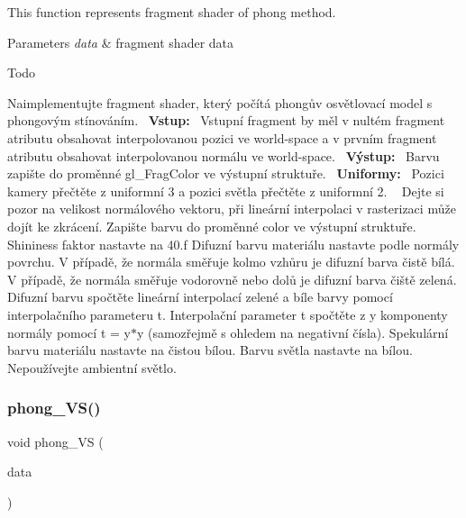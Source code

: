 This function represents fragment shader of phong method. 


\begin{DoxyParams}{Parameters}
{\em data} & fragment shader data \\
\hline
\end{DoxyParams}
\begin{DoxyRefDesc}{Todo}
\item[\hyperlink{todo__todo000003}{Todo}]Naimplementujte fragment shader, který počítá phongův osvětlovací model s phongovým stínováním.~\newline
 {\bfseries Vstup\+:}~\newline
 Vstupní fragment by měl v nultém fragment atributu obsahovat interpolovanou pozici ve world-\/space a v prvním fragment atributu obsahovat interpolovanou normálu ve world-\/space.~\newline
 {\bfseries Výstup\+:}~\newline
 Barvu zapište do proměnné gl\+\_\+\+Frag\+Color ve výstupní struktuře.~\newline
 {\bfseries Uniformy\+:}~\newline
 Pozici kamery přečtěte z uniformní 3 a pozici světla přečtěte z uniformní 2. ~\newline
 Dejte si pozor na velikost normálového vektoru, při lineární interpolaci v rasterizaci může dojít ke zkrácení. Zapište barvu do proměnné color ve výstupní struktuře. Shininess faktor nastavte na 40.\+f Difuzní barvu materiálu nastavte podle normály povrchu. V případě, že normála směřuje kolmo vzhůru je difuzní barva čistě bílá. V případě, že normála směřuje vodorovně nebo dolů je difuzní barva čiště zelená. Difuzní barvu spočtěte lineární interpolací zelené a bíle barvy pomocí interpolačního parameteru t. Interpolační parameter t spočtěte z y komponenty normály pomocí t = y$\ast$y (samozřejmě s ohledem na negativní čísla). Spekulární barvu materiálu nastavte na čistou bílou. Barvu světla nastavte na bílou. Nepoužívejte ambientní světlo.~\newline
 \end{DoxyRefDesc}
\mbox{\label{group__shader__side_gaed1d11e6e120b6a6513075c2e2c7ab19}} 
\subsubsection{\texorpdfstring{phong\+\_\+\+V\+S()}{phong\_VS()}}
{\footnotesize\ttfamily void phong\+\_\+\+VS (\begin{DoxyParamCaption}\item[{\hyperlink{structGPUVertexShaderData}{G\+P\+U\+Vertex\+Shader\+Data} $\ast$const}]{data }\end{DoxyParamCaption})}



